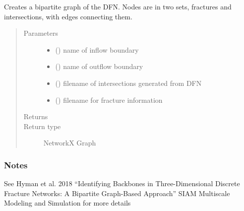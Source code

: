 \documentclass[letterpaper,10pt,english]{sphinxmanual}
\begin{document}
\begin{fulllineitems}
\label{\detokenize{pydfnworks:pydfnworks.dfnGraph.dfn2graph.create_bipartite_graph}}
Creates a bipartite graph of the DFN.
Nodes are in two sets, fractures and intersections, with edges connecting them.
\begin{quote}\begin{description}
\item[{Parameters}] \leavevmode\begin{itemize}
\item {} 
 () \textendash{} name of inflow boundary

\item {} 
 () \textendash{} name of outflow boundary

\item {} 
 () \textendash{} filename of intersections generated from DFN

\item {} 
 () \textendash{} filename for fracture information

\end{itemize}

\item[{Returns}] \leavevmode
{}

\item[{Return type}] \leavevmode
NetworkX Graph

\end{description}\end{quote}
\subsubsection*{Notes}

See Hyman et al. 2018 “Identifying Backbones in Three-Dimensional Discrete Fracture Networks: A Bipartite Graph-Based Approach” SIAM Multiscale Modeling and Simulation for more details

\end{fulllineitems}
\end{document}
